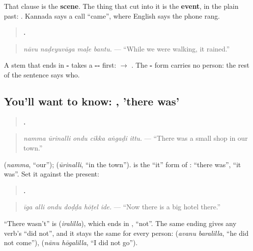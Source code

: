 That clause is the \textbf{scene}. The thing that cut into it is the \textbf{event}, in the plain past: \textbf{}. Kannada says a call \textquotedblleft{}came\textquotedblright{}, where English says the phone rang.

\begin{quote}
\textbf{   .}
\end{quote}

\begin{quote}
\emph{nāvu naḍeyuvāga maḷe bantu.} — \textquotedblleft{}While we were walking, it rained.\textquotedblright{}
\end{quote}

A stem that ends in \textbf{-} takes a \textbf{--} first: \textbf{} $\to$ \textbf{}. The \textbf{-} form carries no person: the rest of the sentence says who.

\subsection*{You'll want to know: , 'there was'}
\begin{quote}
\textbf{     .}
\end{quote}

\begin{quote}
\emph{namma ūrinalli ondu cikka aṅgaḍi ittu.} — \textquotedblleft{}There was a small shop in our town.\textquotedblright{}
\end{quote}

\textbf{} (\emph{namma}, \textquotedblleft{}our\textquotedblright{}); \textbf{} (\emph{ūrinalli}, \textquotedblleft{}in the town\textquotedblright{}). \textbf{} is the \textquotedblleft{}it\textquotedblright{} form of \textbf{}: \textquotedblleft{}there was\textquotedblright{}, \textquotedblleft{}it was\textquotedblright{}. Set it against the present:

\begin{quote}
\textbf{     .}
\end{quote}

\begin{quote}
\emph{īga alli ondu doḍḍa hōṭel ide.} — \textquotedblleft{}Now there is a big hotel there.\textquotedblright{}
\end{quote}

\textquotedblleft{}There wasn't\textquotedblright{} is \textbf{} (\emph{iralilla}), which ends in \textbf{}, \textquotedblleft{}not\textquotedblright{}. The same ending gives any verb's \textquotedblleft{}did not\textquotedblright{}, and it stays the same for every person: \textbf{ } (\emph{avanu baralilla}, \textquotedblleft{}he did not come\textquotedblright{}), \textbf{ } (\emph{nānu hōgalilla}, \textquotedblleft{}I did not go\textquotedblright{}).

